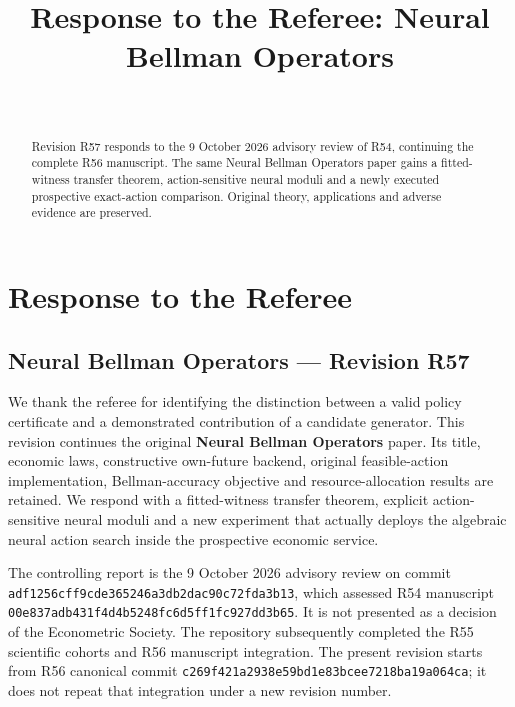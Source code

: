 \documentclass[ecta,nameyear,draft]{econsocart}
\begin{document}
\begin{frontmatter}
\title{Response to the Referee: Neural Bellman Operators}
\begin{aug}
\author[id=au1,addressref={add1}]{~}
\address[id=add1]{Peking University}
\end{aug}
\begin{abstract}Revision R57 responds to the 9 October 2026 advisory review of R54, continuing the complete R56 manuscript. The same Neural Bellman Operators paper gains a fitted-witness transfer theorem, action-sensitive neural moduli and a newly executed prospective exact-action comparison. Original theory, applications and adverse evidence are preserved.\end{abstract}
\end{frontmatter}
\hypertarget{response-to-the-referee}{%
\section{Response to the Referee}\label{response-to-the-referee}}

\hypertarget{neural-bellman-operators-revision-r57}{%
\subsection{Neural Bellman Operators --- Revision
R57}\label{neural-bellman-operators-revision-r57}}

We thank the referee for identifying the distinction between a valid
policy certificate and a demonstrated contribution of a candidate
generator. This revision continues the original \textbf{Neural Bellman
Operators} paper. Its title, economic laws, constructive own-future
backend, original feasible-action implementation, Bellman-accuracy
objective and resource-allocation results are retained. We respond with
a fitted-witness transfer theorem, explicit action-sensitive neural
moduli and a new experiment that actually deploys the algebraic neural
action search inside the prospective economic service.

The controlling report is the 9 October 2026 advisory review on commit
\nolinkurl{adf1256cff9cde365246a3db2dac90c72fda3b13}, which assessed R54
manuscript \nolinkurl{00e837adb431f4d4b5248fc6d5ff1fc927dd3b65}. It is not
presented as a decision of the Econometric Society. The repository
subsequently completed the R55 scientific cohorts and R56 manuscript
integration. The present revision starts from R56 canonical commit
\nolinkurl{c269f421a2938e59bd1e83bcee7218ba19a064ca}; it does not repeat
that integration under a new revision number.
\end{document}
